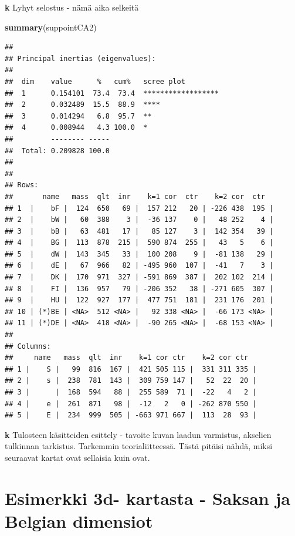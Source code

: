 \documentclass[
  finnish,
]{book}
\newenvironment{Shaded}{\begin{snugshade}}{\end{snugshade}}
\newcommand{\KeywordTok}[1]{\textcolor[rgb]{0.13,0.29,0.53}{\textbf{#1}}}
\newcommand{\NormalTok}[1]{#1}
\begin{document}
\textbf{k} Lyhyt selostus - nämä aika selkeitä

\begin{Shaded}
\begin{Highlighting}[]
\KeywordTok{summary}\NormalTok{(suppointCA2)}
\end{Highlighting}
\end{Shaded}

\begin{verbatim}
## 
## Principal inertias (eigenvalues):
## 
##  dim    value      %   cum%   scree plot               
##  1      0.154101  73.4  73.4  ******************       
##  2      0.032489  15.5  88.9  ****                     
##  3      0.014294   6.8  95.7  **                       
##  4      0.008944   4.3 100.0  *                        
##         -------- -----                                 
##  Total: 0.209828 100.0                                 
## 
## 
## Rows:
##       name   mass  qlt  inr    k=1 cor  ctr    k=2 cor  ctr  
## 1  |    bF |  124  650   69 |  157 212   20 | -226 438  195 |
## 2  |    bW |   60  388    3 |  -36 137    0 |   48 252    4 |
## 3  |    bB |   63  481   17 |   85 127    3 |  142 354   39 |
## 4  |    BG |  113  878  215 |  590 874  255 |   43   5    6 |
## 5  |    dW |  143  345   33 |  100 208    9 |  -81 138   29 |
## 6  |    dE |   67  966   82 | -495 960  107 |  -41   7    3 |
## 7  |    DK |  170  971  327 | -591 869  387 |  202 102  214 |
## 8  |    FI |  136  957   79 | -206 352   38 | -271 605  307 |
## 9  |    HU |  122  927  177 |  477 751  181 |  231 176  201 |
## 10 | (*)BE | <NA>  512 <NA> |   92 338 <NA> |  -66 173 <NA> |
## 11 | (*)DE | <NA>  418 <NA> |  -90 265 <NA> |  -68 153 <NA> |
## 
## Columns:
##     name   mass  qlt  inr    k=1 cor ctr    k=2 cor ctr  
## 1 |    S |   99  816  167 |  421 505 115 |  331 311 335 |
## 2 |    s |  238  781  143 |  309 759 147 |   52  22  20 |
## 3 |      |  168  594   88 |  255 589  71 |  -22   4   2 |
## 4 |    e |  261  871   98 |  -12   2   0 | -262 870 550 |
## 5 |    E |  234  999  505 | -663 971 667 |  113  28  93 |
\end{verbatim}

\textbf{k} Tulosteen käsitteiden esittely - tavoite kuvan laadun varmistus, akselien
tulkinnan tarkistus. Tarkemmin teorialiitteessä. Tästä pitäisi nähdä, miksi seuraavat
kartat ovat sellaisia kuin ovat.

\hypertarget{esimerkki-3d--kartasta---saksan-ja-belgian-dimensiot}{%
\section{Esimerkki 3d- kartasta - Saksan ja Belgian dimensiot}\label{esimerkki-3d--kartasta---saksan-ja-belgian-dimensiot}}
\end{document}
